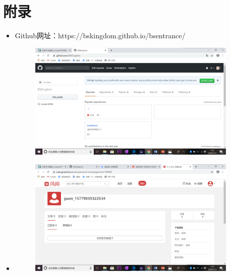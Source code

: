 \documentclass{article}
\begin{document}
\section{附录}
\begin{itemize}
    \item Github网址：https://bskingdom.github.io/bsentrance/
    \begin{figure}[H]
    	\centering
    	\includegraphics[width=10cm]{2020-01-03 (1).png}
    	\label{figupc}
    	
    \end{figure}
    
    \item     \begin{figure}[H]
    	\centering
    	\includegraphics[width=10cm]{2020-01-03 (2).png}
    	\label{figupc}
    	

\end{figure}
\end{itemize}
\end{document}
